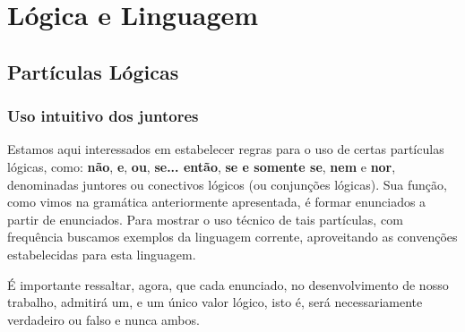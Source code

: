 \chapter{Lógica e Linguagem}

\section{Partículas Lógicas}

\subsection{Uso intuitivo dos juntores}

Estamos aqui interessados em estabelecer regras para o uso de certas partículas lógicas, como: \textbf{não}, \textbf{e},  \textbf{ou}, \textbf{se... então}, \textbf{se e somente se}, \textbf{nem} e \textbf{nor}, denominadas juntores ou conectivos lógicos (ou conjunções lógicas).
Sua função, como vimos na gramática anteriormente apresentada, é formar enunciados a partir de enunciados.
Para mostrar o uso técnico de tais partículas, com frequência buscamos exemplos da  linguagem corrente, aproveitando as convenções estabelecidas para esta linguagem.

É importante ressaltar, agora, que cada enunciado, no desenvolvimento de nosso trabalho, admitirá um, e um único valor lógico, isto é, será necessariamente verdadeiro ou  falso e nunca ambos.

